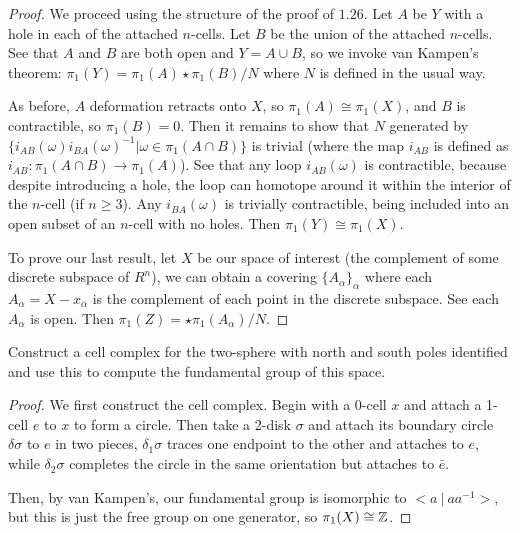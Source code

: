 \documentclass[10pt]{article}
\begin{document}
\begin{proof}

	We proceed using the structure of the proof of $1.26$. Let $A$ be $Y$ with a
	hole in each of the attached $n$-cells. Let $B$ be the union of the attached
	$n$-cells. See that $A$ and $B$ are both open and $Y = A \cup B$, so we
	invoke van Kampen's theorem: $\pi_1(Y) = \pi_1(A) \star \pi_1(B) / N$ where
	$N$ is defined in the usual way.

	As before, $A$ deformation retracts onto $X$, so $\pi_1(A) \cong \pi_1(X)$,
	and $B$ is contractible, so $\pi_1(B) = 0$. Then it remains to show that $N$
	generated by $\{ i_{AB}(\omega) i_{BA}(\omega)^{-1} | \omega \in \pi_1(A \cap
	B) \}$ is trivial (where the map $i_{AB}$ is defined as $i_{AB}: \pi_1(A \cap
	B) \to \pi_1(A)$). See that any loop $i_{AB}(\omega)$ is contractible,
	because despite introducing a hole, the loop can homotope around it within the
	interior of the $n$-cell (if $n \geq 3$). Any $i_{BA}(\omega)$ is trivially
	contractible, being included into an open subset of an $n$-cell with no
	holes. Then $\pi_1(Y) \cong \pi_1(X)$.


	To prove our last result, let $X$ be our space of interest (the complement of
	some discrete subspace of $R^n$), we can obtain a covering $\{ A_{\alpha} \}_{\alpha}$
	where each $A_{\alpha} = X - x_{\alpha}$ is the complement of each point in the discrete
	subspace. See each $A_{\alpha}$ is open. Then $\pi_1(Z) = \star \pi_1(A_{\alpha}) / N$.

\end{proof}

\begin{exercise}[1.2.7]
	Construct a cell complex for the two-sphere with north and south poles
	identified and use this to compute the fundamental group of this space.
\end{exercise}

\begin{proof}
	We first construct the cell complex. Begin with a 0-cell $x$ and attach a
	1-cell $e$ to $x$ to form a circle. Then take a 2-disk $\sigma$ and attach
	its boundary circle $\delta \sigma$ to $e$ in two pieces, $\delta_1 \sigma$
	traces one endpoint to the other and attaches to $e$, while $\delta_2 \sigma$
	completes the circle in the same orientation but attaches to $\bar{e}$.

	Then, by van Kampen's, our fundamental group is isomorphic to $< a ~|~ a a^{-1}
	>$, but this is just the free group on one generator, so $\pi_1(X) \cong \mathbb{Z}$.

\end{proof}
\end{document}
